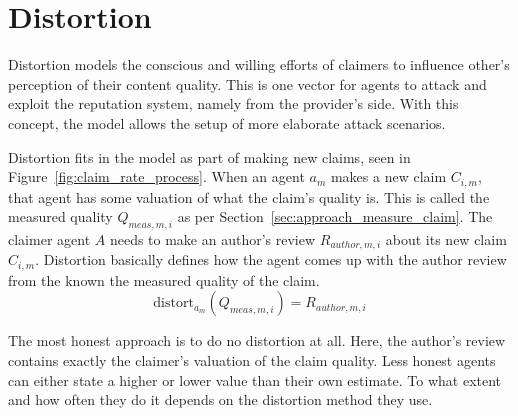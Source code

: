 \documentclass[%
    ]{\PathToTumTemplate/thesis/tum_thesis}
\begin{document}
\section{Distortion}\label{sec:distort_strategies}

Distortion models the conscious and willing efforts of claimers to influence other's perception of their content quality.
This is one vector for agents to attack and exploit the reputation system, namely from the provider's side.
With this concept, the model allows the setup of more elaborate attack scenarios.

Distortion fits in the model as part of making new claims, seen in Figure~\ref{fig:claim_rate_process}.
When an agent $a_m$ makes a new claim $C_{i,m}$, that agent has some valuation of what the claim's quality is.
This is called the measured quality $Q_{meas,m,i}$ as per Section~\ref{sec:approach_measure_claim}.
The claimer agent $A$ needs to make an author's review $R_{author,m,i}$ about its new claim $C_{i,m}$.
Distortion basically defines how the agent comes up with the author review from the known the measured quality of the claim.
\begin{equation}
\mathrm{distort}_{a_m}(Q_{meas,m,i}) = R_{author,m,i}
\end{equation}

The most honest approach is to do no distortion at all.
Here, the author's review contains exactly the claimer's valuation of the claim quality.
Less honest agents can either state a higher or lower value than their own estimate.
To what extent and how often they do it depends on the distortion method they use.




\end{document}

